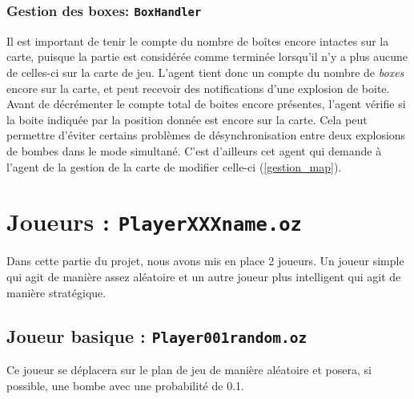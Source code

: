 \documentclass{article}
\begin{document}
\subsubsection{Gestion des boxes: \texttt{BoxHandler}}
\label{gestion_boxes}
Il est important de tenir le compte du nombre de boîtes encore intactes sur la carte, puisque la partie est considérée comme terminée lorsqu'il n'y a plus aucune de celles-ci sur la carte de jeu. L'agent tient donc un compte du nombre de \emph{boxes} encore sur la carte, et peut recevoir des notifications d'une explosion de boite. Avant de décrémenter le compte total de boites encore présentes, l'agent vérifie si la boite indiquée par la position donnée est encore sur la carte. Cela peut permettre d'éviter certains problèmes de désynchronisation entre deux explosions de bombes dans le mode simultané. C'est d'ailleurs cet agent qui demande à l'agent de la gestion de la carte de modifier celle-ci (\ref{gestion_map}).

\section{Joueurs : \texttt{PlayerXXXname.oz}}
Dans cette partie du projet, nous avons mis en place 2 joueurs. Un joueur simple qui agit de manière assez aléatoire et un autre joueur plus intelligent qui agit de manière stratégique.
\subsection{Joueur basique : \texttt{Player001random.oz}}
Ce joueur se déplacera sur le plan de jeu de manière aléatoire et posera, si possible, une bombe avec une probabilité de 0.1.
\end{document}
